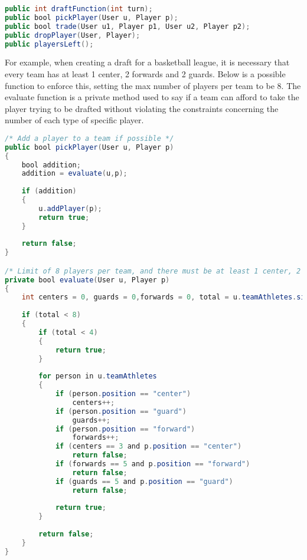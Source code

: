 \documentclass[12pt]{report}
\begin{document}
\begin{singlespace}
\begin{lstlisting}[language=Java,label=some-code,caption=Draft methods]
public int draftFunction(int turn);
public bool pickPlayer(User u, Player p);
public bool trade(User u1, Player p1, User u2, Player p2);
public dropPlayer(User, Player);
public playersLeft();
\end{lstlisting}
\end{singlespace}

For example, when creating a draft for a basketball league, it is necessary that every team has at least 1 center, 2 forwards and 2 guards. Below is a possible function to enforce this, setting the max number of players per team to be 8. The evaluate function is a private method used to say if a team can afford to take the player trying to be drafted without violating the constraints concerning the number of each type of specific player.

\begin{singlespace}
\begin{lstlisting}[language=Java,label=some-code,caption=Picking a Player]
/* Add a player to a team if possible */
public bool pickPlayer(User u, Player p)
{
	bool addition;
	addition = evaluate(u,p);
	
	if (addition)
	{
		u.addPlayer(p);
		return true;
	}
	
	return false;
}

/* Limit of 8 players per team, and there must be at least 1 center, 2 guards and 2 forwards per team. */
private bool evaluate(User u, Player p)
{
	int centers = 0, guards = 0,forwards = 0, total = u.teamAthletes.size();
	
	if (total < 8)
	{
		if (total < 4)
		{
			return true;
		}
		
		for person in u.teamAthletes
		{
			if (person.position == "center")
				centers++;
			if (person.position == "guard")
				guards++;
			if (person.position == "forward")
				forwards++;
			if (centers == 3 and p.position == "center")
				return false;
			if (forwards == 5 and p.position == "forward")
				return false;
			if (guards == 5 and p.position == "guard")
				return false;
				
			return true;
		}
		
		return false;
	}
}
\end{lstlisting}
\end{singlespace}
\end{document}
